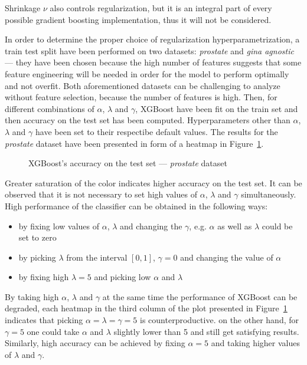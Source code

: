 \documentclass[magisterska, english]{pwr_wmat_praca_dyplomowa}
\theoremstyle{plain}
\numberwithin{theorem}{chapter}
\theoremstyle{definition}
\numberwithin{theorem}{chapter}
\begin{document}
Shrinkage $\nu$ also controls regularization, but it is an integral part of every possible gradient boosting implementation, thus it will not be considered.

In order to determine the proper choice of regularization hyperparametrization, a train test split have been performed on two datasets: \emph{prostate} and \emph{gina agnostic} --- they have been chosen because the high number of features suggests that some feature engineering will be needed in order for the model to perform optimally and not overfit. Both aforementioned datasets can be challenging to analyze without feature selection, because the number of features is high. Then, for different combinations of $\alpha$, $\lambda$ and $\gamma$, XGBoost have been fit on the train set and then accuracy on the test set has been computed. Hyperparameters other than $\alpha$, $\lambda$ and $\gamma$ have been set to their respectibe default values. The results for the \emph{prostate} dataset have been presented in form of a heatmap in Figure~\ref{fig:regularization_prostate}.

\begin{figure}[H]
	\centering
	\caption{XGBoost's accuracy on the test set --- \emph{prostate} dataset}
	\label{fig:regularization_prostate}
\end{figure}

Greater saturation of the color indicates higher accuracy on the test set. It can be observed that it is not necessary to set high values of $\alpha$, $\lambda$ and $\gamma$ simultaneously. High performance of the classifier can be obtained in the following ways:
\begin{itemize}
    \item by fixing low values of $\alpha$, $\lambda$ and changing the $\gamma$, e.g. $\alpha$ as well as $\lambda$ could be set to zero
    \item by picking $\lambda$ from the interval $[0, 1]$, $\gamma=0$ and changing the value of $\alpha$
    \item by fixing high $\lambda=5$ and picking low $\alpha$ and $\lambda$
\end{itemize}

By taking high $\alpha$, $\lambda$ and $\gamma$ at the same time the performance of XGBoost can be degraded, each heatmap in the third column of the plot presented in Figure~\ref{fig:regularization_prostate} indicates that picking $\alpha=\lambda=\gamma=5$ is counterproductive. on the other hand, for $\gamma=5$ one could take $\alpha$ and $\lambda$ slightly lower than 5 and still get satisfying results. Similarly, high accuracy can be achieved by fixing $\alpha=5$ and taking higher values of $\lambda$ and $\gamma$.
\end{document}
